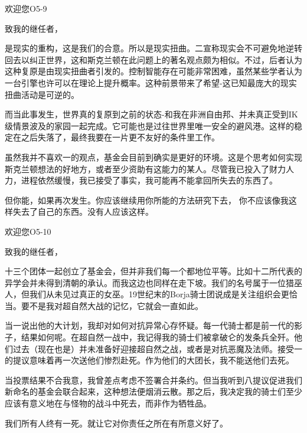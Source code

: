 \begin{whiteboxbb}
\begin{scpbox}
\end{scpbox}

\begin{scpbox}

欢迎您O5-9

致我的继任者，

是现实的重构，这是我们的合意。所以是现实扭曲。二宣称现实会不可避免地逆转回去以纠正世界，这和斯克兰顿在此问题上的著名观点颇为相似。不过，后者认为这种复原是由现实扭曲者引发的。控制智能存在可能非常困难，虽然某些学者认为一台引擎也许可以在理论上提升概率。这种前景带来了希望-这已知最庞大的现实扭曲活动是可逆的。

而当此事发生，世界真的复原到之前的状态-和我在非洲自由邦、并未真正受到IK级情景波及的家园一起完成。它可能也是过往世界里唯一安全的避风港。这样的稳定在之后失落了，最终我要在一片更不友好的条件里工作。

虽然我并不喜欢一的观点，基金会目前到确实是更好的环境。这是个思考如何实现斯克兰顿想法的好地方，或者至少资助有这能力的某人。尽管我已投入了财力人力，进程依然缓慢，我已接受了事实，我可能再不能拿回所失去的东西了。

但你能，如果再次发生。你应该继续用你所能的方法研究下去， 你不应该像我这样失去了自己的东西。没有人应该这样。

\end{scpbox}

\begin{scpbox}

欢迎您O5-10

致我的继任者，

十三个团体一起创立了基金会，但并非我们每一个都地位平等。比如十二所代表的异学会并未得到清朝的承认。而我这边也同样在走下坡。我们的名号属于一位猎巫人，但我们从未见过真正的女巫。19世纪末的Borja骑士团说成是关注组织会更恰当。要不是我对超自然大战的记忆，它就会一直如此。

当一说出他的大计划，我却对如何对抗异常心存怀疑。每一代骑士都是前一代的影子，结果如何呢。在超自然一战中，我记得我的骑士们被拿破仑的发条兵全歼。他们过去（现在也是）并未准备好迎接超自然之战，或者是对抗恶魔及法师。接受一的提议意味着再一次送他们惨烈赴死。作为他们的大团长，我不能送他们去死。

当投票结果不合我意，我曾差点考虑不签署合并条约。但当我听到八提议促进我们新命名的基金会联合起来，这种想法便烟消云散。那之后，我决定我的骑士们至少应该有意义地在与怪物的战斗中死去，而非作为牺牲品。

我们所有人终有一死。就让它对你责任之所在有所意义好了。


\end{scpbox}
\end{whiteboxbb}
